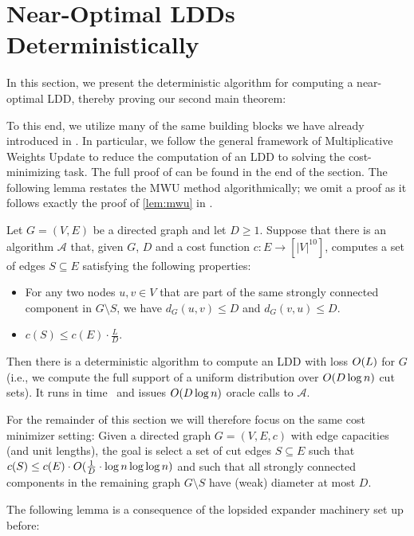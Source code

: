 \section{Near-Optimal LDDs Deterministically} \label{sec:ldd-deterministic}
In this section, we present the deterministic algorithm for computing a near-optimal LDD, thereby proving our second main theorem:

\thmMainDet*

To this end, we utilize many of the same building blocks we have already introduced in . In particular, we follow the general framework of Multiplicative Weights Update to reduce the computation of an LDD to solving the cost-minimizing task. The full proof of  can be found in the end of the section. The following lemma restates the MWU method algorithmically; we omit a proof as it follows exactly the proof of \cref{lem:mwu} in . 

\begin{lemma}
Let $G = (V, E)$ be a directed graph and let $D \geq 1$. Suppose that there is an algorithm $\mathcal A$ that, given $G$, $D$ and a cost function $c : E \to [|V|^{10}]$, computes a set of edges $S \subseteq E$ satisfying the following properties:
\begin{itemize}
	\item For any two nodes $u, v \in V$ that are part of the same strongly connected component in $G \setminus S$, we have $d_G(u, v) \leq D$ and $d_G(v, u) \leq D$.
	\item $c(S) \leq c(E) \cdot \frac{L}{D}$.
\end{itemize}
Then there is a deterministic algorithm to compute an LDD with loss $O(L)$ for $G$ (i.e., we compute the full support of a uniform distribution over $O(D \log n)$ cut sets). It runs in time~ and issues $O(D \log n)$ oracle calls to $\mathcal A$.
\end{lemma}

For the remainder of this section we will therefore focus on the same cost minimizer setting: Given a directed graph $G = (V, E, c)$ with edge capacities (and unit lengths), the goal is select a set of cut edges $S \subseteq E$ such that $c(S) \leq c(E) \cdot O(\frac{1}{D} \cdot \log n \log\log n)$ and such that all strongly connected components in the remaining graph $G \setminus S$ have (weak) diameter at most $D$.

The following lemma is a consequence of the lopsided expander machinery set up before:

